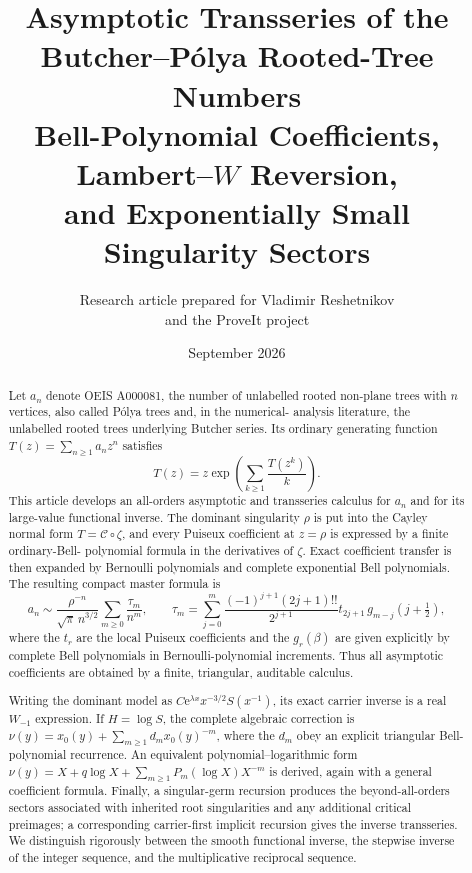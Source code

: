 \documentclass[11pt,oneside]{article}
\title{\Huge\bfseries Asymptotic Transseries of the\\[1mm]
Butcher--P\'olya Rooted-Tree Numbers\\[2mm]
\Large Bell-Polynomial Coefficients, Lambert--$W$ Reversion,\\
and Exponentially Small Singularity Sectors}
\author{Research article prepared for Vladimir Reshetnikov\\and the ProveIt project}
\date{September 2026}
\numberwithin{equation}{section}
\theoremstyle{plain}
\theoremstyle{definition}
\theoremstyle{remark}
\newcommand{\e}{\mathrm e}
\newcommand{\Cay}{\mathcal C}
\begin{document}
\maketitle

\begin{abstract}
Let $a_n$ denote OEIS A000081, the number of unlabelled rooted non-plane
 trees with $n$ vertices, also called P\'olya trees and, in the numerical-
analysis literature, the unlabelled rooted trees underlying Butcher series.
Its ordinary generating function $T(z)=\sum_{n\ge1}a_nz^n$ satisfies
\[
 T(z)=z\exp\!\left(\sum_{k\ge1}\frac{T(z^k)}{k}\right).
\]
This article develops an all-orders asymptotic and transseries calculus for
$a_n$ and for its large-value functional inverse.  The dominant singularity
$\rho$ is put into the Cayley normal form $T=\Cay\circ\zeta$, and every
Puiseux coefficient at $z=\rho$ is expressed by a finite ordinary-Bell-
polynomial formula in the derivatives of $\zeta$.  Exact coefficient
transfer is then expanded by Bernoulli polynomials and complete exponential
Bell polynomials.  The resulting compact master formula is
\[
 a_n\sim \frac{\rho^{-n}}{\sqrt{\pi}\,n^{3/2}}
 \sum_{m\ge0}\frac{\tau_m}{n^m},\qquad
 \tau_m=\sum_{j=0}^{m}
 \frac{(-1)^{j+1}(2j+1)!!}{2^{j+1}}
 t_{2j+1}\,g_{m-j}\!\left(j+\tfrac12\right),
\]
where the $t_r$ are the local Puiseux coefficients and the $g_r(\beta)$
are given explicitly by complete Bell polynomials in Bernoulli-polynomial
increments.  Thus all asymptotic coefficients are obtained by a finite,
triangular, auditable calculus.

Writing the dominant model as
$C\e^{\lambda x}x^{-3/2}S(x^{-1})$, its exact carrier inverse is a real
$W_{-1}$ expression.  If $H=\log S$, the complete algebraic correction is
$\nu(y)=x_0(y)+\sum_{m\ge1}d_mx_0(y)^{-m}$, where the $d_m$ obey an explicit
triangular Bell-polynomial recurrence.  An equivalent polynomial--logarithmic
form $\nu(y)=X+q\log X+\sum_{m\ge1}P_m(\log X)X^{-m}$ is derived, again with
a general coefficient formula.  Finally, a singular-germ recursion produces
the beyond-all-orders sectors associated with inherited root singularities
and any additional critical preimages; a corresponding carrier-first
implicit recursion gives the inverse transseries.  We distinguish rigorously
between the smooth functional inverse, the stepwise inverse of the integer
sequence, and the multiplicative reciprocal sequence.
\end{abstract}
\end{document}
